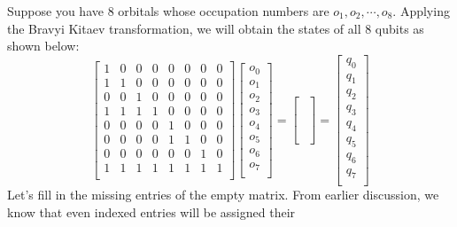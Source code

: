 \documentclass{article}
\begin{document}
    Suppose you have 8 orbitals whose occupation numbers are
    \({o_1, o_2, \cdots , o_8}\). Applying the Bravyi Kitaev transformation,
    we will obtain the states of all 8 qubits as shown below:
    \[
    \begin{bmatrix}
    1 & 0 & 0 & 0 & 0 & 0 & 0 & 0\\
    1 & 1 & 0 & 0 & 0 & 0 & 0 & 0\\
    0 & 0 & 1 & 0 & 0 & 0 & 0 & 0\\
    1 & 1 & 1 & 1 & 0 & 0 & 0 & 0\\
    0 & 0 & 0 & 0 & 1 & 0 & 0 & 0\\
    0 & 0 & 0 & 0 & 1 & 1 & 0 & 0\\
    0 & 0 & 0 & 0 & 0 & 0 & 1 & 0\\
    1 & 1 & 1 & 1 & 1 & 1 & 1 & 1\\
    \end{bmatrix}
    \begin{bmatrix}
    o_0 \\
    o_1 \\
    o_2 \\
    o_3 \\
    o_4 \\
    o_5 \\
    o_6 \\
    o_7 \\
    \end{bmatrix}
    =
    \begin{bmatrix}
     \\
     \\
      \\
     \\
      \\
     \\
      \\
     \\
    \end{bmatrix}
    =
    \begin{bmatrix}
    q_0 \\
    q_1 \\
    q_2 \\
    q_3 \\
    q_4 \\
    q_5 \\
    q_6 \\
    q_7 \\
    \end{bmatrix}
    \]
    Let's fill in the missing entries of the empty matrix. From earlier
    discussion, we know that even indexed entries will be assigned their
\end{document}
